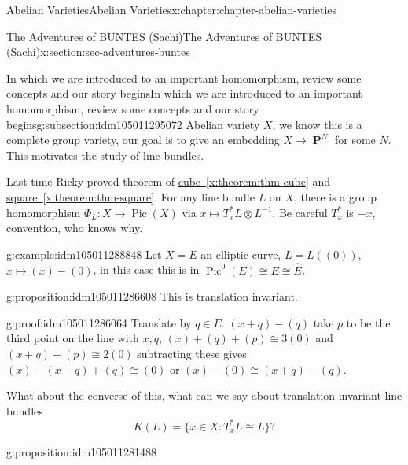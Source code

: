 \documentclass[oneside,10pt,]{book}
\numberwithin{equation}{section}
\DeclareMathOperator{\Pic}{Pic}
\DeclareMathOperator{\PP}{\mathbf{P}}
\begin{document}
\begin{chapterptx}{Abelian Varieties}{}{Abelian Varieties}{}{}{x:chapter:chapter-abelian-varieties}
\typeout{************************************************}
%
\begin{sectionptx}{The Adventures of BUNTES (Sachi)}{}{The Adventures of BUNTES (Sachi)}{}{}{x:section:sec-adventures-buntes}
%
%
\typeout{************************************************}
\typeout{************************************************}
%
\begin{subsectionptx}{In which we are introduced to an important homomorphism, review some concepts and our story begins}{}{In which we are introduced to an important homomorphism, review some concepts and our story begins}{}{}{g:subsection:idm105011295072}
Abelian variety  \(X\), we know this is a complete group variety, our goal is to give an embedding \(X\to \PP^N\) for some \(N\). This motivates the study of line bundles.%
\par
Last time Ricky proved theorem of \hyperref[x:theorem:thm-cube]{cube~\ref{x:theorem:thm-cube}} and \hyperref[x:theorem:thm-square]{square~\ref{x:theorem:thm-square}}. For any line bundle  \(L\) on \(X\), there is a group homomorphism \(\Phi_L\colon X \to \Pic(X)\) via \(x\mapsto T_x^* L\otimes L^{-1}\). Be careful \(T_x^*\) is \(-x\), convention, who knows why.%
\begin{example}{}{g:example:idm105011288848}%
Let \(X =E\) an elliptic curve, \(L = L((0))\), \(x\mapsto (x) - (0)\), in this case this is in \(\Pic^0(E) \cong E \cong \widehat E\),%
\end{example}
\begin{proposition}{}{}{g:proposition:idm105011286608}%
This is translation invariant.%
\end{proposition}
\begin{proofptx}{}{g:proof:idm105011286064}
Translate by \(q\in E\). \((x+q) - (q)\) take \(p\) to be the third point on the line with \(x,q\), \((x) + (q) + (p) \cong 3(0)\) and \((x+q) + (p) \cong 2 (0)\) subtracting these gives \((x) - (x+q) +(q) \cong (0)\) or \((x) - (0) \cong (x+q) -(q)\).%
\end{proofptx}
What about the converse of this, what can we say about translation invariant line bundles%
\begin{equation*}
K(L) = \{x\in X : T_x^* L \cong L\}\text{?}
\end{equation*}
%
\begin{proposition}{}{}{g:proposition:idm105011281488}%

\end{proposition}
\end{subsectionptx}
\end{sectionptx}
\end{chapterptx}
\end{document}

